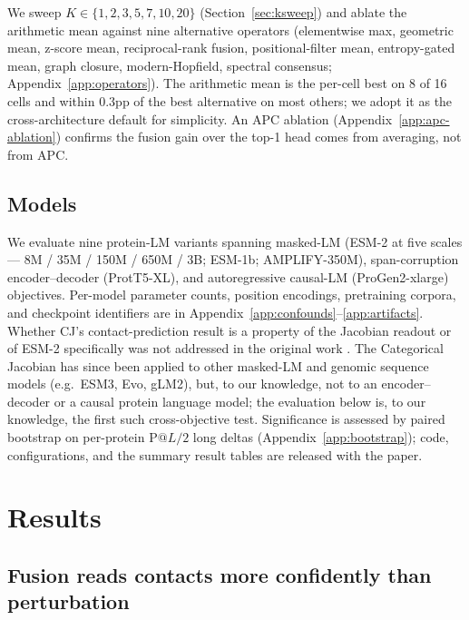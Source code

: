 \documentclass{article}
\begin{document}
We sweep $K \in \{1,2,3,5,7,10,20\}$ (Section~\ref{sec:ksweep}) and
ablate the arithmetic mean against nine alternative operators
(elementwise max, geometric mean, z-score mean, reciprocal-rank
fusion, positional-filter mean, entropy-gated mean, graph closure,
modern-Hopfield, spectral consensus; Appendix~\ref{app:operators}).
The arithmetic mean is the per-cell best on 8 of 16 cells and within
$0.3$pp of the best alternative on most others; we adopt it as the
cross-architecture default for simplicity. An APC ablation
(Appendix~\ref{app:apc-ablation}) confirms the fusion gain over the
top-1 head comes from averaging, not from APC.

\subsection{Models}

We evaluate nine protein-LM variants spanning masked-LM (ESM-2 at
five scales --- 8M / 35M / 150M / 650M / 3B; ESM-1b; AMPLIFY-350M),
span-corruption encoder--decoder (ProtT5-XL), and autoregressive
causal-LM (ProGen2-xlarge) objectives. Per-model parameter counts,
position encodings, pretraining corpora, and checkpoint identifiers are
in Appendix~\ref{app:confounds}--\ref{app:artifacts}. Whether CJ's
contact-prediction result is a property of the Jacobian readout or of
ESM-2 specifically was not addressed in the original work
\citep{zhang2024cj}. The Categorical Jacobian has since been applied to
other masked-LM and genomic sequence models (e.g.\ ESM3, Evo, gLM2),
but, to our knowledge, not to an encoder--decoder or a causal protein
language model; the evaluation below is, to our knowledge, the first
such cross-objective test. Significance is assessed by paired bootstrap on
per-protein $\text{P}@L/2$ long deltas (Appendix~\ref{app:bootstrap});
code, configurations, and the summary result tables are released with
the paper.

\section{Results}

\subsection{Fusion reads contacts more confidently than perturbation}
\label{sec:confidence}
\end{document}
